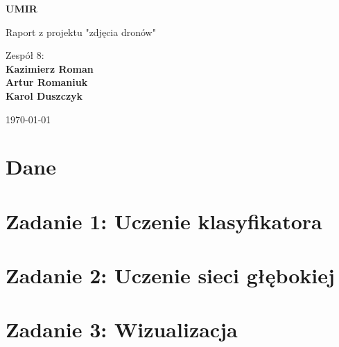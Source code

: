 \documentclass[a4paper]{article}
\begin{document}
\begin{titlepage}
    \begin{center}
        \vspace*{1cm}
            
        \Huge
        \textbf{UMIR}
            
        \vspace{0.5cm}
        \LARGE
        Raport z projektu "zdjęcia dronów"
            
        \vspace{1.5cm}
            
        Zespół 8:\\
        \textbf{Kazimierz Roman\\
                Artur Romaniuk\\
                Karol Duszczyk}
            
        \vfill

        \vspace{0.8cm}
            
        \Large
        \today
        
            
    \end{center}
\end{titlepage}

\tableofcontents

\newpage

\section{Dane}


\section{Zadanie 1: Uczenie klasyfikatora}


\section{Zadanie 2: Uczenie sieci głębokiej}


\section{Zadanie 3: Wizualizacja}


% 
\end{document}
